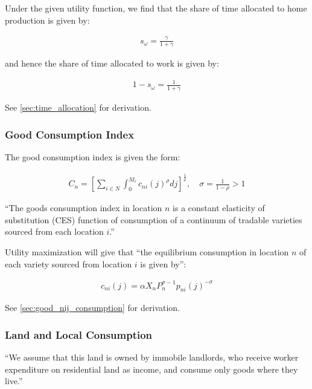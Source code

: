 \documentclass[10pt]{article}
\begin{document}
Under the given utility function, we find that 
the share of time allocated to home production is given by:

\begin{align}
    s_\omega = \frac{\gamma}{1+\gamma} \label{eq:time_allocation}
\end{align}

and hence the share of time allocated to work is given by:

\begin{align}
    1 - s_\omega = \frac{1}{1+\gamma} \label{eq:time_allocation2}
\end{align}

See \autoref{sec:time_allocation} for derivation.


\subsubsection{Good Consumption Index}

The good consumption index is given the form:

\begin{align}
    C_n=\left[\sum_{i \in N} \int_0^{M_i} c_{n i}(j)^\rho d j\right]^{\frac{1}{\rho}}, \quad \sigma=\frac{1}{1-\rho}>1
\end{align}

``The goods consumption index in location $n$ is a constant elasticity of 
substitution (CES) function of consumption of a continuum of tradable 
varieties sourced from each location $i$.''

Utility maximization 
will give that ``the equilibrium consumption 
in location $n$ of each variety sourced from 
location $i$ 
is given by'':

\begin{align}
    c_{n i}(j)=\alpha X_n P_n^{\sigma-1} p_{n i}(j)^{-\sigma} \label{eq:good_nij_consumption}
\end{align}

See \autoref{sec:good_nij_consumption} for derivation.

\subsubsection{Land and Local Consumption}

``We assume that this land is owned by immobile landlords,
who receive worker expenditure on residential land as income, and consume only
goods where they live.''
\end{document}
